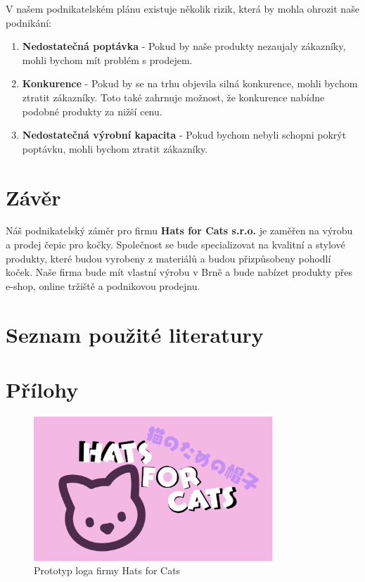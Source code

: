 \documentclass[12pt, a4paper]{article}
\begin{document}
V našem podnikatelském plánu existuje několik rizik, která by mohla ohrozit naše podnikání:

\begin{enumerate}
  \item \textbf{Nedostatečná poptávka} - Pokud by naše produkty nezaujaly zákazníky, mohli bychom mít problém s prodejem.
  \item \textbf{Konkurence} - Pokud by se na trhu objevila silná konkurence, mohli bychom ztratit zákazníky.
  Toto také zahrnuje možnost, že konkurence nabídne podobné produkty za nižší cenu.
  \item \textbf{Nedostatečná výrobní kapacita} - Pokud bychom nebyli schopni pokrýt poptávku, mohli bychom ztratit zákazníky.
\end{enumerate}

\section{Závěr}

Náš podnikatelský záměr pro firmu \textbf{Hats for Cats s.r.o.} je zaměřen na výrobu a prodej čepic pro kočky.
Společnost se bude specializovat na kvalitní a stylové produkty, které budou vyrobeny z materiálů a budou přizpůsobeny pohodlí koček.
Naše firma bude mít vlastní výrobu v Brně a bude nabízet produkty přes e-shop, online tržiště a podnikovou prodejnu.

\section{Seznam použité literatury}
\printbibliography[heading=none]
\section{Přílohy}

\begin{figure}[h]
  \centering
  \includegraphics[width=0.8\textwidth]{files/logo.png}
  \caption{Prototyp loga firmy Hats for Cats}
\end{figure}

\listoftables
\end{document}
